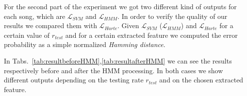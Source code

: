 \begin{table}[t]
	\hfill
	\hfill
	\hfill
	\vspace{-3mm}
	\caption{Results of the second part}
	\vspace{-6mm}
\end{table}

For the second part of the experiment we got two different kind of outputs for each song, which are $\mathcal{L}_{SVM}$ and $\mathcal{L}_{HMM}$. In order to verify the quality of our results we compared them with  $\mathcal{L}_{Harte}$. Given $\mathcal{L}_{SVM}$ ($\mathcal{L}_{HMM}$) and $\mathcal{L}_{Harte}$ for a certain value of $r_{test}$ and for a certain extracted feature we computed the error probability as a simple normalized \textit{Hamming distance}.

 In Tabs.~\ref{tab:resultbeforeHMM},\ref{tab:resultafterHMM} we can see the results respectively before and after the HMM processing. In both cases we show different outputs depending on the testing rate $r_{test}$ and on the chosen extracted feature.

